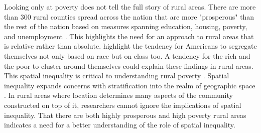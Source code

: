  Looking only at poverty does not tell the full story of rural areas. There are more than 300 rural counties spread across the nation that are more "prosperous" than the rest of the nation based on measures spanning education, housing, poverty, and unemployment \citep{isserman_why_2009}.  This highlights the need for an approach to rural areas that is relative rather than absolute. \citet{metzger_fair_2017} highlight the tendency for Americans to segregate themselves not only based on race but on class too. A tendency for the rich and the poor to cluster around themselves could explain these findings in rural areas. This spatial inequality is critical to understanding rural poverty \citep{thiede_spatial_2018}.  Spatial inequality expands concerns with stratification into the realm of geographic space \citep{lobao_spatial_2002}. In rural areas where location determines many aspects of the community constructed on top of it, researchers cannot ignore the implications of spatial inequality. That there are both highly prosperous and high poverty rural areas indicates a need for a better understanding of the role of spatial inequality. 

